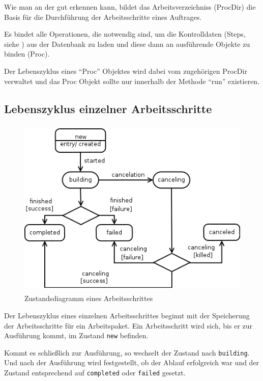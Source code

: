 Wie man an der  gut erkennen kann,
bildet das Arbeitsverzeichniss (ProcDir) die Basis
für die Durchführung der Arbeitsschritte eines Auftrages.

Es bindet alle Operationen, die notwendig sind,
um die Kontrolldaten (Steps, siehe )
aus der Datenbank zu laden und diese dann an ausführende Objekte zu binden (Proc).

Der Lebenszyklus eines ``Proc'' Objektes wird dabei vom zugehörigen ProcDir verwaltet
und das Proc Objekt sollte nur innerhalb der Methode ``run'' existieren.


\subsection{Lebenszyklus einzelner Arbeitsschritte}


\begin{figure}[ht] 
    \centering
    \includegraphics[height=3.4in]{imageinput/lebenszyklus-arbeitsschritt.png}
    \caption{Zustandsdiagramm eines Arbeitsschrittes}
    \label{fig:lebenszyklus-arbeitsschritt}
\end{figure}

Der Lebenszyklus eines einzelnen Arbeitsschrittes beginnt mit der Speicherung der Arbeitsschritte für ein Arbeitspaket. Ein Arbeitsschritt wird sich, bis er zur Ausführung kommt, im Zustand \verb|new| befinden.

Kommt es schließlich zur Ausführung, so wechselt der Zustand nach \verb|building|.
Und nach der Ausführung wird festgestellt, ob der Ablauf erfolgreich war und der Zustand entsprechend auf \verb|completed| oder \verb|failed| gesetzt.

